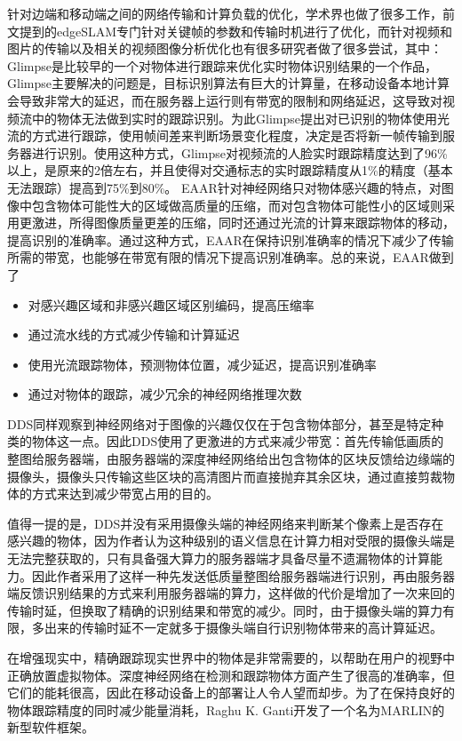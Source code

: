 针对边端和移动端之间的网络传输和计算负载的优化，学术界也做了很多工作，前文提到的edgeSLAM专门针对关键帧的参数和传输时机进行了优化，而针对视频和图片的传输以及相关的视频图像分析优化也有很多研究者做了很多尝试，其中：
Glimpse\cite{CheRavDen15}是比较早的一个对物体进行跟踪来优化实时物体识别结果的一个作品，Glimpse主要解决的问题是，目标识别算法有巨大的计算量，在移动设备本地计算会导致非常大的延迟，而在服务器上运行则有带宽的限制和网络延迟，这导致对视频流中的物体无法做到实时的跟踪识别。为此Glimpse提出对已识别的物体使用光流的方式进行跟踪，使用帧间差来判断场景变化程度，决定是否将新一帧传输到服务器进行识别。使用这种方式，Glimpse对视频流的人脸实时跟踪精度达到了96\%以上，是原来的2倍左右，并且使得对交通标志的实时跟踪精度从1\%的精度（基本无法跟踪）提高到75\%到80\%。
EAAR\cite{DuPerYua20}针对神经网络只对物体感兴趣的特点，对图像中包含物体可能性大的区域做高质量的压缩，而对包含物体可能性小的区域则采用更激进，所得图像质量更差的压缩，同时还通过光流的计算来跟踪物体的移动，提高识别的准确率。通过这种方式，EAAR在保持识别准确率的情况下减少了传输所需的带宽，也能够在带宽有限的情况下提高识别准确率。总的来说，EAAR做到了
\begin{itemize}
  \item 对感兴趣区域和非感兴趣区域区别编码，提高压缩率
  \item 通过流水线的方式减少传输和计算延迟
  \item 使用光流跟踪物体，预测物体位置，减少延迟，提高识别准确率
  \item 通过对物体的跟踪，减少冗余的神经网络推理次数
\end{itemize}


DDS\cite{liu2019edge}同样观察到神经网络对于图像的兴趣仅仅在于包含物体部分，甚至是特定种类的物体这一点。因此DDS使用了更激进的方式来减少带宽：首先传输低画质的整图给服务器端，由服务器端的深度神经网络给出包含物体的区块反馈给边缘端的摄像头，摄像头只传输这些区块的高清图片而直接抛弃其余区块，通过直接剪裁物体的方式来达到减少带宽占用的目的。

值得一提的是，DDS并没有采用摄像头端的神经网络来判断某个像素上是否存在感兴趣的物体，因为作者认为这种级别的语义信息在计算力相对受限的摄像头端是无法完整获取的，只有具备强大算力的服务器端才具备尽量不遗漏物体的计算能力。因此作者采用了这样一种先发送低质量整图给服务器端进行识别，再由服务器端反馈识别结果的方式来利用服务器端的算力，这样做的代价是增加了一次来回的传输时延，但换取了精确的识别结果和带宽的减少。同时，由于摄像头端的算力有限，多出来的传输时延不一定就多于摄像头端自行识别物体带来的高计算延迟。

在增强现实中，精确跟踪现实世界中的物体是非常需要的，以帮助在用户的视野中正确放置虚拟物体。深度神经网络在检测和跟踪物体方面产生了很高的准确率，但它们的能耗很高，因此在移动设备上的部署让人令人望而却步。为了在保持良好的物体跟踪精度的同时减少能量消耗，Raghu K. Ganti开发了一个名为MARLIN\cite{ApiRanChe19}的新型软件框架。

